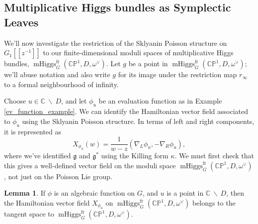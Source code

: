 \documentclass[11pt, oneside, reqno]{amsart}
\theoremstyle{definition} \newtheorem{definition}{Definition}[section]
\newtheorem{lemma}[definition]{Lemma}
\theoremstyle{definition} \newtheorem{remark}[definition]{Remark}
\theoremstyle{definition} \newtheorem{remarks}[definition]{Remarks}
\theoremstyle{definition} \newtheorem{question}[definition]{Question}
\theoremstyle{definition} \newtheorem*{note}{Note}
\theoremstyle{definition} \newtheorem{example}[definition]{Example}
\theoremstyle{definition} \newtheorem{examples}[definition]{Examples}
\renewcommand{\gg}{\mathfrak{g}}
\newcommand{\bb}[1]{\mathbb{#1}}
\newcommand{\bs}{\ \backslash \ }
\newcommand{\CC}{\mathbb{C}}
\DeclareMathOperator{\mhiggs}{mHiggs}
\newcommand{\fr}{\mathrm{fr}}
\begin{document}
\subsection{Multiplicative Higgs bundles as Symplectic Leaves}
We'll now investigate the restriction of the Sklyanin Poisson structure on $G_1[[z^{-1}]]$ to our finite-dimensional moduli spaces of multiplicative Higgs bundles, $\mhiggs^\fr_G(\bb{CP}^1, D, \omega^\vee)$.  Let $g$ be a point in $\mhiggs^\fr_G(\bb{CP}^1, D, \omega^\vee)$; we'll abuse notation and also write $g$ for its image under the restriction map $r_\infty$ to a formal neighbourhood of infinity.

Choose $u \in \CC \bs D$, and let $\phi_u$ be an evaluation function as in Example \ref{ev_function_example}.  We can identify the Hamiltonian vector field associated to $\phi_u$ using the Sklyanin Poisson structure.  In terms of left and right components, it is represented as
\begin{equation}
\label{eq:Xphiz}
X_{\phi_u}(w) =  \frac{1}{w - z} (\nabla_{L} \phi_u,  - \nabla_{R} \phi_u),
\end{equation}
where we've identified $\gg$ and $\gg^*$ using the Killing form $\kappa$.  We must first check that this gives a well-defined vector field on the moduli space $\mhiggs^\fr_G(\bb{CP}^1, D, \omega^\vee)$, not just on the Poisson Lie group.

\begin{lemma}\label{phitoX}
  If $\phi$ is an algebraic function on $G$, and $u$ is a point in $\CC \bs D$, then the Hamiltonian vector field $X_{\phi_u}$ on $\mhiggs^\fr_G(\bb{CP}^1, D, \omega^\vee)$ belongs to the tangent space to $\mhiggs^\fr_G(\bb{CP}^1, D, \omega^\vee)$.  
\end{lemma}
\end{document}
